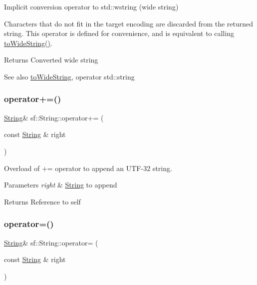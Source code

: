 Implicit conversion operator to std\+::wstring (wide string) 

Characters that do not fit in the target encoding are discarded from the returned string. This operator is defined for convenience, and is equivalent to calling \hyperlink{classsf_1_1_string_a9d81aa3103e7e2062bd85d912a5aecf1}{to\+Wide\+String()}.

\begin{DoxyReturn}{Returns}
Converted wide string
\end{DoxyReturn}
\begin{DoxySeeAlso}{See also}
\hyperlink{classsf_1_1_string_a9d81aa3103e7e2062bd85d912a5aecf1}{to\+Wide\+String}, operator std\+::string 
\end{DoxySeeAlso}
\mbox{\label{classsf_1_1_string_ae6563ce2c243ae2160eea8a354199f4e}} 
\subsubsection{\texorpdfstring{operator+=()}{operator+=()}}
{\footnotesize\ttfamily \hyperlink{classsf_1_1_string}{String}\& sf\+::\+String\+::operator+= (\begin{DoxyParamCaption}\item[{const \hyperlink{classsf_1_1_string}{String} \&}]{right }\end{DoxyParamCaption})}



Overload of += operator to append an U\+T\+F-\/32 string. 


\begin{DoxyParams}{Parameters}
{\em right} & \hyperlink{classsf_1_1_string}{String} to append\\
\hline
\end{DoxyParams}
\begin{DoxyReturn}{Returns}
Reference to self 
\end{DoxyReturn}
\mbox{\label{classsf_1_1_string_a096255c066e5ef8c31952216b8ce9c42}} 
\subsubsection{\texorpdfstring{operator=()}{operator=()}}
{\footnotesize\ttfamily \hyperlink{classsf_1_1_string}{String}\& sf\+::\+String\+::operator= (\begin{DoxyParamCaption}\item[{const \hyperlink{classsf_1_1_string}{String} \&}]{right }\end{DoxyParamCaption})}



